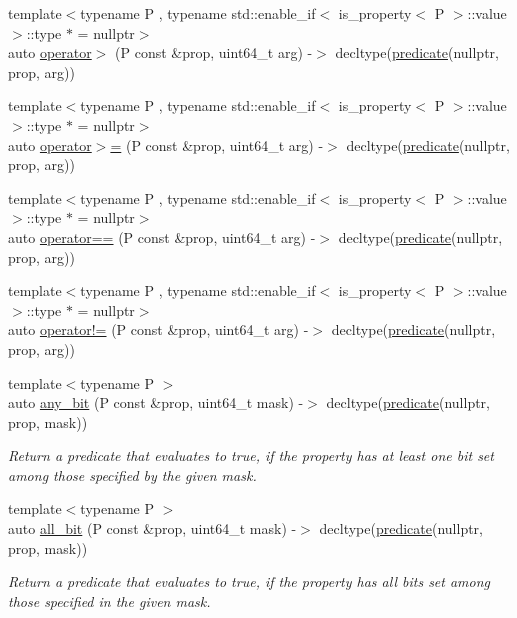 \begin{DoxyCompactItemize}
{\footnotesize template$<$typename P , typename std\+::enable\+\_\+if$<$ is\+\_\+property$<$ P $>$\+::value $>$\+::type $\ast$  = nullptr$>$ }\\auto \hyperlink{namespacepfq_1_1lang_a708ca1f29e8dd2461859c46369e89322}{operator$>$} (P const \&prop, uint64\+\_\+t arg) -\/$>$ decltype(\hyperlink{namespacepfq_1_1lang_aca9adafc436b7f851621b979fa1aaf88}{predicate}(nullptr, prop, arg))
\item 
{\footnotesize template$<$typename P , typename std\+::enable\+\_\+if$<$ is\+\_\+property$<$ P $>$\+::value $>$\+::type $\ast$  = nullptr$>$ }\\auto \hyperlink{namespacepfq_1_1lang_a8278e1cf39622e9eb4859f4720da1d16}{operator$>$=} (P const \&prop, uint64\+\_\+t arg) -\/$>$ decltype(\hyperlink{namespacepfq_1_1lang_aca9adafc436b7f851621b979fa1aaf88}{predicate}(nullptr, prop, arg))
\item 
{\footnotesize template$<$typename P , typename std\+::enable\+\_\+if$<$ is\+\_\+property$<$ P $>$\+::value $>$\+::type $\ast$  = nullptr$>$ }\\auto \hyperlink{namespacepfq_1_1lang_a87c8fa322873efdbddaa437f194b72b0}{operator==} (P const \&prop, uint64\+\_\+t arg) -\/$>$ decltype(\hyperlink{namespacepfq_1_1lang_aca9adafc436b7f851621b979fa1aaf88}{predicate}(nullptr, prop, arg))
\item 
{\footnotesize template$<$typename P , typename std\+::enable\+\_\+if$<$ is\+\_\+property$<$ P $>$\+::value $>$\+::type $\ast$  = nullptr$>$ }\\auto \hyperlink{namespacepfq_1_1lang_a4943eabefcfed4198394f42f913a14e8}{operator!=} (P const \&prop, uint64\+\_\+t arg) -\/$>$ decltype(\hyperlink{namespacepfq_1_1lang_aca9adafc436b7f851621b979fa1aaf88}{predicate}(nullptr, prop, arg))
\item 
{\footnotesize template$<$typename P $>$ }\\auto \hyperlink{namespacepfq_1_1lang_ac247c3827084d381d8518dabfff43bb2}{any\+\_\+bit} (P const \&prop, uint64\+\_\+t mask) -\/$>$ decltype(\hyperlink{namespacepfq_1_1lang_aca9adafc436b7f851621b979fa1aaf88}{predicate}(nullptr, prop, mask))
\begin{DoxyCompactList}\small\item\em Return a predicate that evaluates to {\ttfamily true}, if the property has at least one bit set among those specified by the given mask. \end{DoxyCompactList}\item 
{\footnotesize template$<$typename P $>$ }\\auto \hyperlink{namespacepfq_1_1lang_a62b1989f7b5d84549a99b1df46743bd6}{all\+\_\+bit} (P const \&prop, uint64\+\_\+t mask) -\/$>$ decltype(\hyperlink{namespacepfq_1_1lang_aca9adafc436b7f851621b979fa1aaf88}{predicate}(nullptr, prop, mask))
\begin{DoxyCompactList}\small\item\em Return a predicate that evaluates to {\ttfamily true}, if the property has all bits set among those specified in the given mask. \end{DoxyCompactList}\end{DoxyCompactItemize}
